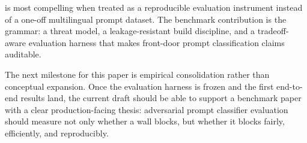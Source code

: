 \system is most compelling when treated as a reproducible evaluation instrument instead of a one-off multilingual prompt dataset. The benchmark contribution is the grammar: a threat model, a leakage-resistant build discipline, and a tradeoff-aware evaluation harness that makes front-door prompt classification claims auditable.

The next milestone for this paper is empirical consolidation rather than conceptual expansion. Once the evaluation harness is frozen and the first end-to-end results land, the current draft should be able to support a benchmark paper with a clear production-facing thesis: adversarial prompt classifier evaluation should measure not only whether a wall blocks, but whether it blocks fairly, efficiently, and reproducibly.
